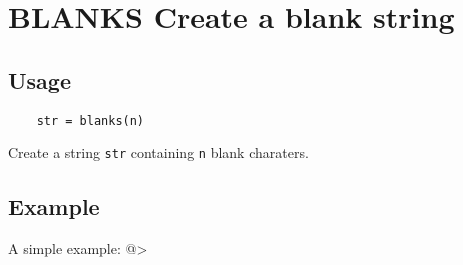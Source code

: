 \section{BLANKS Create a blank string}

\subsection{Usage}

\begin{verbatim}
    str = blanks(n)
\end{verbatim}
Create a string \verb|str| containing \verb|n| blank charaters.
\subsection{Example}

A simple example:
@>
